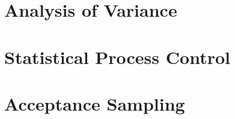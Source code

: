\section{Analysis of Variance}

\newpage
\section{Statistical Process Control}

\newpage
\section{Acceptance Sampling}
